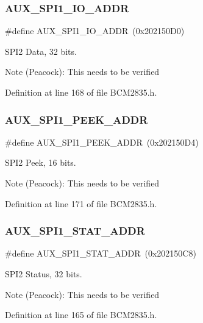 \subsubsection{\texorpdfstring{A\+U\+X\+\_\+\+S\+P\+I1\+\_\+\+I\+O\+\_\+\+A\+D\+DR}{AUX\_SPI1\_IO\_ADDR}}
{\footnotesize\ttfamily \#define A\+U\+X\+\_\+\+S\+P\+I1\+\_\+\+I\+O\+\_\+\+A\+D\+DR~(0x202150\+D0)}



S\+P\+I2 Data, 32 bits. 

\begin{DoxyNote}{Note}
(Peacock)\+: This needs to be verified 
\end{DoxyNote}


Definition at line 168 of file B\+C\+M2835.\+h.

\mbox{\label{group__SPI_ga4f35d0db4cc890579d44879d06967f6c}} 
\subsubsection{\texorpdfstring{A\+U\+X\+\_\+\+S\+P\+I1\+\_\+\+P\+E\+E\+K\+\_\+\+A\+D\+DR}{AUX\_SPI1\_PEEK\_ADDR}}
{\footnotesize\ttfamily \#define A\+U\+X\+\_\+\+S\+P\+I1\+\_\+\+P\+E\+E\+K\+\_\+\+A\+D\+DR~(0x202150\+D4)}



S\+P\+I2 Peek, 16 bits. 

\begin{DoxyNote}{Note}
(Peacock)\+: This needs to be verified 
\end{DoxyNote}


Definition at line 171 of file B\+C\+M2835.\+h.

\mbox{\label{group__SPI_ga35cdf7d5e580feb11441cebbf94d2c1f}} 
\subsubsection{\texorpdfstring{A\+U\+X\+\_\+\+S\+P\+I1\+\_\+\+S\+T\+A\+T\+\_\+\+A\+D\+DR}{AUX\_SPI1\_STAT\_ADDR}}
{\footnotesize\ttfamily \#define A\+U\+X\+\_\+\+S\+P\+I1\+\_\+\+S\+T\+A\+T\+\_\+\+A\+D\+DR~(0x202150\+C8)}



S\+P\+I2 Status, 32 bits. 

\begin{DoxyNote}{Note}
(Peacock)\+: This needs to be verified 
\end{DoxyNote}


Definition at line 165 of file B\+C\+M2835.\+h.


